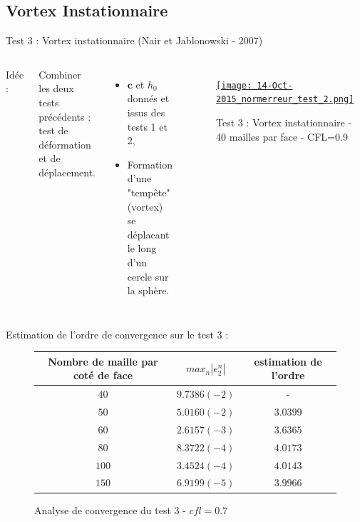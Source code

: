 \documentclass[11pt]{beamer}
\begin{document}
\subsection{Vortex Instationnaire}
\begin{frame}{Test 3 : Vortex instationnaire (Nair et Jablonowski - 2007)}
\begin{columns}
Idée :

Combiner les deux tests précédents : test de déformation et de déplacement.
\begin{itemize}

\item $\mathbf{c}$ et $h_0$ donnés et issus des tests 1 et 2,

\item Formation d'une "tempête" (vortex) se déplacant le long d'un cercle sur la sphère.
\end{itemize}



\begin{figure}
\href{run:CSapprox_test2.avi}{\texttt{[image: 14-Oct-2015\_normerreur\_test\_2.png]}} 
\caption{Test 3 : Vortex instationnaire - 40 mailles par face - CFL=0.9}
\end{figure}
\end{columns}
\end{frame}

\begin{frame}

Estimation de l'ordre de convergence sur le test 3 :

\begin{figure}
\begin{tabular}{ccc}
Nombre de maille par coté de face & $max_n |e_2^n|$ & estimation de l'ordre \\
\hline
\hline
$40$ & $9.7386 (-2)$ & - \\
\hline 
$50$ & $5.0160 (-2)$ & $3.0399$ \\
\hline
$60$ & $2.6157 (-3)$ & $3.6365$ \\
\hline
$80$ & $8.3722 (-4)$ & $4.0173$ \\
\hline
$100$ & $3.4524 (-4)$ & $4.0143$\\
\hline
$150$ & $6.9199 (-5)$ & $3.9966$
\end{tabular}
\caption{Analyse de convergence du test 3 - $cfl = 0.7$}
\end{figure}

\end{frame}
\end{document}
